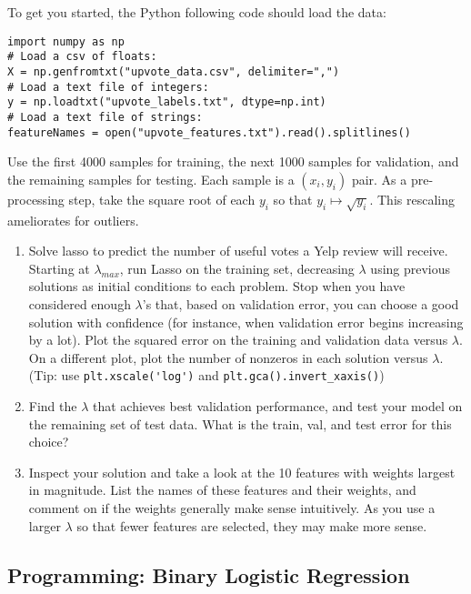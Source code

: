\documentclass{article}
\newcommand{\1}{\mathbf{1}}
\begin{document}
To get you started, the Python following code should load the data:

\begin{verbatim}
import numpy as np
# Load a csv of floats:
X = np.genfromtxt("upvote_data.csv", delimiter=",")
# Load a text file of integers:
y = np.loadtxt("upvote_labels.txt", dtype=np.int)
# Load a text file of strings:
featureNames = open("upvote_features.txt").read().splitlines()
\end{verbatim}

Use the first 4000 samples for training, the next 1000 samples for validation, and the remaining samples for testing.
Each sample is a $(x_i,y_i)$ pair. As a pre-processing step, take the square root of each $y_i$ so that $y_i \mapsto \sqrt{y_i}$. This rescaling ameliorates for outliers.
\begin{enumerate}
  \item Solve lasso to predict the number of useful votes a Yelp review will receive.  
  Starting at $\lambda_{max}$, run Lasso on the training set, decreasing $\lambda$ using
  previous solutions as initial conditions to each problem. Stop when you have
  considered enough $\lambda$'s that, based on validation error, you can
  choose a good solution with confidence (for instance, when validation
  error begins increasing by a lot).
  Plot the squared error on the training and validation data versus $\lambda$.
  On a different plot, plot the number of nonzeros in each solution versus $\lambda$.
   (Tip: use \verb|plt.xscale('log')| and \verb|plt.gca().invert_xaxis()|)\\
  \item Find the $\lambda$ that achieves best validation
  performance, and test your model on the remaining set of test data.  What is the train, val, and test error for this choice?
  \item Inspect your solution and take a look at the 10 features with weights largest in magnitude.
  List the names of these features and their weights, and comment on if the weights generally make sense intuitively. As you use a larger $\lambda$ so that fewer features are selected, they may make more sense.
\end{enumerate}  

\subsection{Programming: Binary Logistic Regression}
\end{document}
